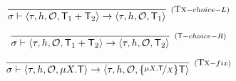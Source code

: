 \documentclass[a4paper,UKenglish]{article}%
\theoremstyle{plain}
\begin{document}
\[
\infer[{\scriptstyle{(\Tx-choice-L)}}]{\thdstack \vdash \langle \txstack, \heap, \mathcal{O}, \trans_1 + \trans_2 \rangle 
\rightarrow \langle  \txstack, \heap, \mathcal{O}, \trans_1 \rangle}{}
\]

\[
\infer[{\scriptstyle{(\trans-choice-R)}}]{\thdstack \vdash \langle \txstack, \heap, \mathcal{O}, \trans_1 + \trans_2 \rangle 
\rightarrow \langle  \txstack, \heap, \mathcal{O}, \trans_2 \rangle}{}
\]

\[
\infer[{\scriptstyle{(\Tx-fix)}}]{\thdstack \vdash \langle \txstack, \heap, \mathcal{O}, \mu X.\trans \rangle 
\rightarrow \langle  \txstack, \heap, \mathcal{O}, \{\nicefrac{\mu X.\trans}{X}\}\trans \rangle}{}
\]

%
\end{document}
